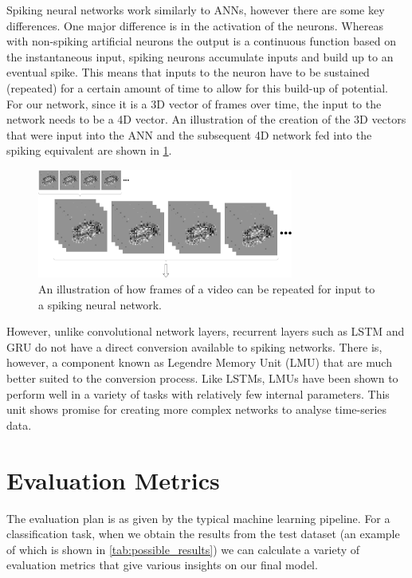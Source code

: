 Spiking neural networks work similarly to ANNs, however there are some key differences. One major difference is in the activation of the neurons. Whereas with non-spiking artificial neurons the output is a continuous function based on the instantaneous input, spiking neurons accumulate inputs and build up to an eventual spike. This means that inputs to the neuron have to be sustained (repeated) for a certain amount of time to allow for this build-up of potential. For our network, since it is a 3D vector of frames over time, the input to the network needs to be a 4D vector. An illustration of the creation of the 3D vectors that were input into the ANN and the subsequent 4D network fed into the spiking equivalent are shown in \cref{fig:sustained_video}.

\begin{figure}[htb]
    \centering
    \includegraphics[width=0.75\textwidth]{analysisanddesign/images/sustained_video.png}
    \caption{An illustration of how frames of a video can be repeated for input to a spiking neural network.}
    \label{fig:sustained_video}
\end{figure}

However, unlike convolutional network layers, recurrent layers such as LSTM and GRU do not have a direct conversion available to spiking networks. There is, however, a component known as Legendre Memory Unit (LMU) that are much better suited to the conversion process. Like LSTMs, LMUs have been shown to perform well in a variety of tasks with relatively few internal parameters\cite{LMU}. This unit shows promise for creating more complex networks to analyse time-series data.

\section{Evaluation Metrics} \label{sec:evalutaion_metrics}

The evaluation plan is as given by the typical machine learning pipeline\cite{IntroToML}. For a classification task, when we obtain the results from the test dataset (an example of which is shown in \cref{tab:possible_results}) we can calculate a variety of evaluation metrics that give various insights on our final model.

